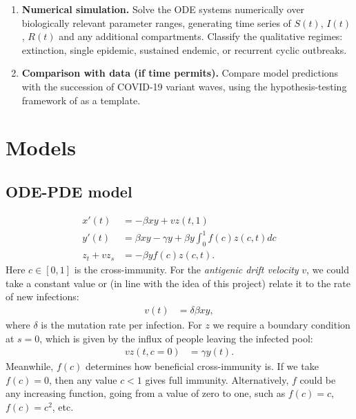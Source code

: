 \documentclass[12pt]{article}
\begin{document}
\begin{enumerate}
  \item \textbf{Numerical simulation.} Solve the ODE systems numerically
    over biologically relevant parameter ranges, generating time series of
    $S(t)$, $I(t)$, $R(t)$ and any additional compartments. Classify the
    qualitative regimes: extinction, single epidemic, sustained endemic,
    or recurrent cyclic outbreaks.

  \item \textbf{Comparison with data (if time permits).} Compare model
    predictions with the succession of COVID-19 variant waves, using the
    hypothesis-testing framework of \cite{ngonghala2025} as a template.
\end{enumerate}

\section{Models}

\subsection{ODE-PDE model}

\begin{subequations}
\begin{align}
    x'(t) & = - \beta x y + v z(t,1) \\
    y'(t) & = \beta x y - \gamma y + \beta y \int_0^1 f(c) z(c,t) dc \\
    z_t + v z_s & = -\beta y f(c) z(c,t).
\end{align}
\end{subequations}
Here $c\in[0,1]$ is the cross-immunity.  For the \emph{antigenic drift velocity} $v$,
we could take a constant value or (in line with the idea of this project) relate it
to the rate of new infections:
\begin{align}
    v(t) & = \delta \beta x y,
\end{align}
where $\delta$ is the mutation rate per infection.
For $z$ we require a boundary condition at $s=0$, which is given by the
influx of people leaving the infected pool:
\begin{align}
    v z(t,c=0) & = \gamma y(t).
\end{align}
Meanwhile, $f(c)$ determines how beneficial cross-immunity is.  If we take $f(c)=0$,
then any value $c<1$ gives full immunity.  Alternatively, $f$ could be any increasing
function, going from a value of zero to one, such as $f(c)=c$, $f(c)=c^2$, etc.



\end{document}
